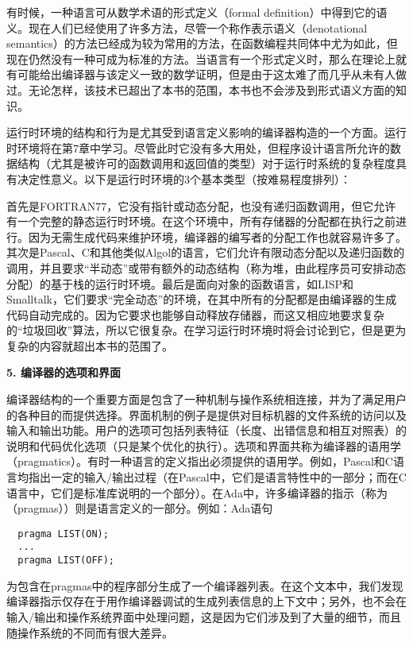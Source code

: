 \documentclass[lang=cn,10pt]{elegantbook}
\begin{document}
有时候，一种语言可从数学术语的形式定义（formal definition）中得到它的语义。现在人们已经使用了许多方法，尽管一个称作表示语义（denotational semantics）的方法已经成为较为常用的方法，在函数编程共同体中尤为如此，但现在仍然没有一种可成为标准的方法。当语言有一个形式定义时，那么在理论上就有可能给出编译器与该定义一致的数学证明，但是由于这太难了而几乎从未有人做过。无论怎样，该技术已超出了本书的范围，本书也不会涉及到形式语义方面的知识。

运行时环境的结构和行为是尤其受到语言定义影响的编译器构造的一个方面。运行时环境将在第7章中学习。尽管此时它没有多大用处，但程序设计语言所允许的数据结构（尤其是被许可的函数调用和返回值的类型）对于运行时系统的复杂程度具有决定性意义。以下是运行时环境的3个基本类型（按难易程度排列）：

首先是FORTRAN77，它没有指针或动态分配，也没有递归函数调用，但它允许有一个完整的静态运行时环境。在这个环境中，所有存储器的分配都在执行之前进行。因为无需生成代码来维护环境，编译器的编写者的分配工作也就容易许多了。其次是Pascal、C和其他类似Algol的语言，它们允许有限动态分配以及递归函数的调用，并且要求“半动态”或带有额外的动态结构（称为堆，由此程序员可安排动态分配）的基于栈的运行时环境。最后是面向对象的函数语言，如LISP和Smalltalk，它们要求“完全动态”的环境，在其中所有的分配都是由编译器的生成代码自动完成的。因为它要求也能够自动释放存储器，而这又相应地要求复杂的“垃圾回收”算法，所以它很复杂。在学习运行时环境时将会讨论到它，但是更为复杂的内容就超出本书的范围了。

\textbf{5. 编译器的选项和界面}

编译器结构的一个重要方面是包含了一种机制与操作系统相连接，并为了满足用户的各种目的而提供选择。界面机制的例子是提供对目标机器的文件系统的访问以及输入和输出功能。用户的选项可包括列表特征（长度、出错信息和相互对照表）的说明和代码优化选项（只是某个优化的执行）。选项和界面共称为编译器的语用学（pragmatics）。有时一种语言的定义指出必须提供的语用学。例如，Pascal和C语言均指出一定的输入/输出过程（在Pascal中，它们是语言特性中的一部分；而在C语言中，它们是标准库说明的一个部分）。在Ada中，许多编译器的指示（称为（pragmas））则是语言定义的一部分。例如：Ada语句

\begin{lstlisting}
  pragma LIST(ON);
  ...
  pragma LIST(OFF);
\end{lstlisting}

为包含在pragmas中的程序部分生成了一个编译器列表。在这个文本中，我们发现编译器指示仅存在于用作编译器调试的生成列表信息的上下文中；另外，也不会在输入/输出和操作系统界面中处理问题，这是因为它们涉及到了大量的细节，而且随操作系统的不同而有很大差异。
\end{document}
